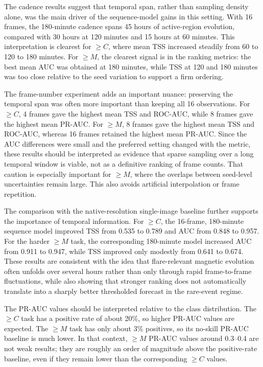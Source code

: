 The cadence results suggest that temporal span, rather than sampling density alone, was the main driver of the sequence-model gains in this setting. With 16 frames, the 180-minute cadence spans 45 hours of active-region evolution, compared with 30 hours at 120 minutes and 15 hours at 60 minutes. This interpretation is clearest for $\geq C$, where mean TSS increased steadily from 60 to 120 to 180 minutes. For $\geq M$, the clearest signal is in the ranking metrics: the best mean AUC was obtained at 180 minutes, while TSS at 120 and 180 minutes was too close relative to the seed variation to support a firm ordering.

The frame-number experiment adds an important nuance: preserving the temporal span was often more important than keeping all 16 observations. For $\geq C$, 4 frames gave the highest mean TSS and ROC-AUC, while 8 frames gave the highest mean PR-AUC. For $\geq M$, 8 frames gave the highest mean TSS and ROC-AUC, whereas 16 frames retained the highest mean PR-AUC. Since the AUC differences were small and the preferred setting changed with the metric, these results should be interpreted as evidence that sparse sampling over a long temporal window is viable, not as a definitive ranking of frame counts. That caution is especially important for $\geq M$, where the overlaps between seed-level uncertainties remain large. This also avoids artificial interpolation or frame repetition.

The comparison with the native-resolution single-image baseline further supports the importance of temporal information. For $\geq C$, the 16-frame, 180-minute sequence model improved TSS from 0.535 to 0.789 and AUC from 0.848 to 0.957. For the harder $\geq M$ task, the corresponding 180-minute model increased AUC from 0.911 to 0.947, while TSS improved only modestly from 0.641 to 0.674. These results are consistent with the idea that flare-relevant magnetic evolution often unfolds over several hours rather than only through rapid frame-to-frame fluctuations, while also showing that stronger ranking does not automatically translate into a sharply better thresholded forecast in the rare-event regime.

The PR-AUC values should be interpreted relative to the class distribution. The $\geq C$ task has a positive rate of about 20\%, so higher PR-AUC values are expected. The $\geq M$ task has only about 3\% positives, so its no-skill PR-AUC baseline is much lower. In that context, $\geq M$ PR-AUC values around 0.3--0.4 are not weak results; they are roughly an order of magnitude above the positive-rate baseline, even if they remain lower than the corresponding $\geq C$ values.

